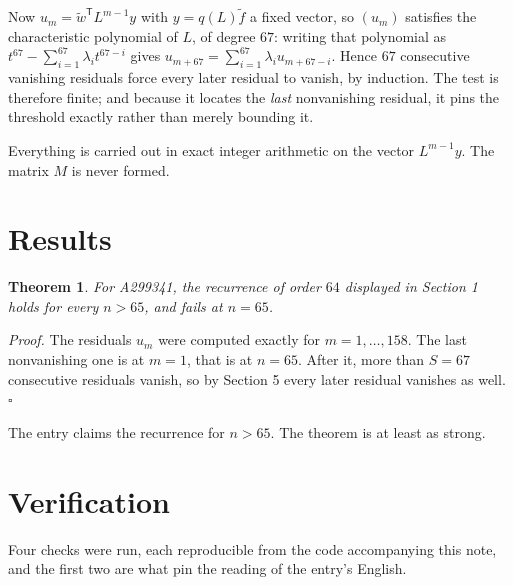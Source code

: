 \documentclass[11pt]{article}
\newtheorem{theorem}{Theorem}
\theoremstyle{definition}
\begin{document}
Now $u_m = \tilde w^{\mathsf T} L^{m-1} y$ with $y = q(L)\tilde f$ a fixed vector, so $(u_m)$ satisfies the characteristic polynomial of $L$, of degree $67$: writing that polynomial as $t^{67} - \sum_{i=1}^{67} \lambda_i t^{67-i}$ gives $u_{m+67} = \sum_{i=1}^{67} \lambda_i u_{m+67-i}$. Hence $67$ consecutive vanishing residuals force every later residual to vanish, by induction. The test is therefore finite; and because it locates the {\itshape last} nonvanishing residual, it pins the threshold exactly rather than merely bounding it.

Everything is carried out in exact integer arithmetic on the vector $L^{m-1}y$. The matrix $M$ is never formed.

\section{Results}

\begin{theorem} For A299341, the recurrence of order $64$ displayed in Section 1 holds for every $n > 65$, and fails at $n = 65$.\end{theorem}

{\itshape Proof.} The residuals $u_m$ were computed exactly for $m = 1,\dots,158$. The last nonvanishing one is at $m = 1$, that is at $n = 65$. After it, more than $S = 67$ consecutive residuals vanish, so by Section 5 every later residual vanishes as well. $\square$

The entry claims the recurrence for $n > 65$. The theorem is at least as strong.

\section{Verification}

Four checks were run, each reproducible from the code accompanying this note, and the first two are what pin the reading of the entry's English.
\end{document}
